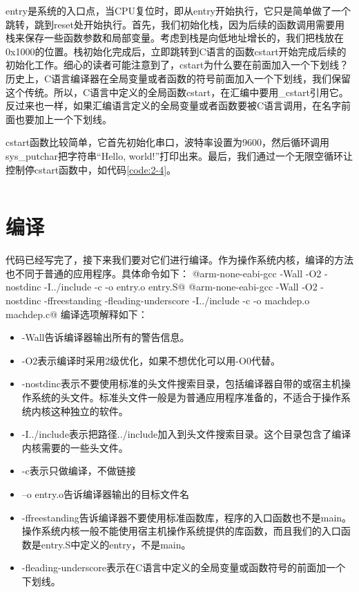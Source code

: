 \documentclass[main.tex]{subfiles}
\begin{document}
\begin{CJK*}{UTF8}{song}
\begin{code}
\label{code:2-3}
\inputminted[linenos,numbersep=5pt,frame=lines,framesep=2mm]{gas}{src/chapter02/kernel/entry.S}
\end{code}


entry是系统的入口点，当CPU复位时，即从entry开始执行，它只是简单做了一个跳转，跳到reset处开始执行。首先，我们初始化栈，因为后续的函数调用需要用栈来保存一些函数参数和局部变量。考虑到栈是向低地址增长的，我们把栈放在0x1000的位置。栈初始化完成后，立即跳转到C语言的函数cstart开始完成后续的初始化工作。细心的读者可能注意到了，cstart为什么要在前面加入一个下划线？历史上，C语言编译器在全局变量或者函数的符号前面加入一个下划线，我们保留这个传统。所以，C语言中定义的全局函数cstart，在汇编中要用\_cstart引用它。反过来也一样，如果汇编语言定义的全局变量或者函数要被C语言调用，在名字前面也要加上一个下划线。

\par
cstart函数比较简单，它首先初始化串口，波特率设置为9600，然后循环调用sys\_putchar把字符串“Hello, world!”打印出来。最后，我们通过一个无限空循环让控制停cstart函数中，如代码\ref{code:2-4}。

\begin{code}
\label{code:2-4}
\inputminted[firstline=42,lastline=54,linenos,numbersep=5pt,frame=lines,framesep=2mm]{c}{src/chapter02/kernel/machdep.c}
\end{code}


\section{编译}
代码已经写完了，接下来我们要对它们进行编译。作为操作系统内核，编译的方法也不同于普通的应用程序。具体命令如下：
@arm-none-eabi-gcc -Wall -O2 -nostdinc -I../include -c -o entry.o entry.S@
@arm-none-eabi-gcc -Wall -O2 -nostdinc -ffreestanding -fleading-underscore -I../include -c -o machdep.o machdep.c@
\noindent
编译选项解释如下：
\begin{itemize}
	\item -Wall告诉编译器输出所有的警告信息。
	\item -O2表示编译时采用2级优化，如果不想优化可以用-O0代替。
	\item -nostdinc表示不要使用标准的头文件搜索目录，包括编译器自带的或宿主机操作系统的头文件。标准头文件一般是为普通应用程序准备的，不适合于操作系统内核这种独立的软件。
	\item -I../include表示把路径../include加入到头文件搜索目录。这个目录包含了编译内核需要的一些头文件。
	\item -c表示只做编译，不做链接
	\item –o entry.o告诉编译器输出的目标文件名
	\item -ffreestanding告诉编译器不要使用标准函数库，程序的入口函数也不是main。操作系统内核一般不能使用宿主机操作系统提供的库函数，而且我们的入口函数是entry.S中定义的entry，不是main。
	\item -fleading-underscore表示在C语言中定义的全局变量或函数符号的前面加一个下划线。
\end{itemize}


\end{CJK*}
\end{document}
